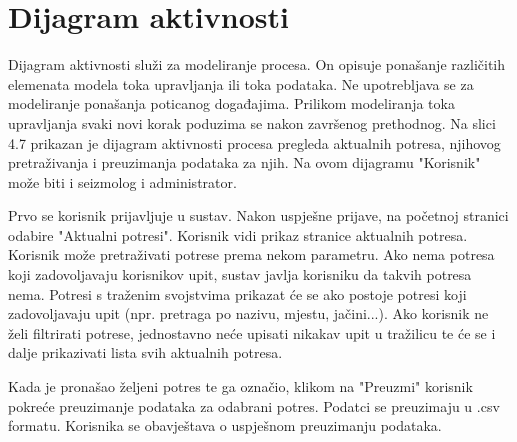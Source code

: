 			\eject 
		
		\section{Dijagram aktivnosti}
		
		Dijagram aktivnosti služi za modeliranje procesa. On opisuje ponašanje različitih elemenata modela toka upravljanja ili toka podataka. Ne upotrebljava se za modeliranje ponašanja poticanog događajima. Prilikom modeliranja toka upravljanja svaki novi korak poduzima se nakon završenog
		prethodnog. Na slici 4.7 prikazan je dijagram aktivnosti procesa pregleda aktualnih potresa, njihovog pretraživanja i preuzimanja podataka za njih. 
		Na ovom dijagramu "Korisnik" može biti i seizmolog i administrator.
		
		Prvo se korisnik prijavljuje u sustav. Nakon uspješne prijave, na početnoj stranici odabire "Aktualni potresi". Korisnik vidi prikaz stranice aktualnih potresa. Korisnik može pretraživati potrese prema nekom parametru. Ako nema potresa koji zadovoljavaju korisnikov upit, sustav javlja korisniku da takvih potresa nema. Potresi s traženim svojstvima prikazat će se ako postoje potresi koji zadovoljavaju upit (npr. pretraga po nazivu, mjestu, jačini...). Ako korisnik ne želi filtrirati potrese, jednostavno neće upisati nikakav upit u tražilicu te će se i dalje prikazivati lista svih aktualnih potresa.
		
		Kada je pronašao željeni potres te ga označio, klikom na "Preuzmi" korisnik pokreće preuzimanje podataka za odabrani potres. Podatci se preuzimaju u .csv formatu. Korisnika se obavještava o uspješnom preuzimanju podataka.
		

